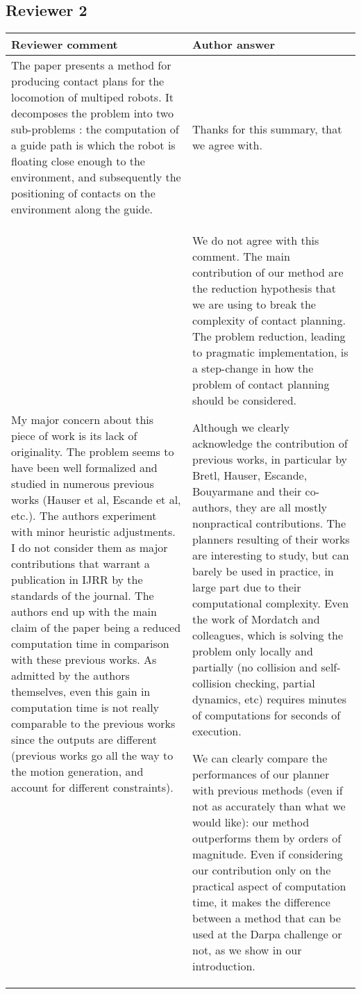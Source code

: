 \documentclass[a4paper]{article}
\begin{document}
\subsection{Reviewer 2}
\noindent
\begin{longtable}{|p{21em}|p{21em}|}
\hline \bf Reviewer comment & \bf Author answer \\
\hline
The paper presents a method for producing contact plans for the locomotion of multiped robots. It decomposes the problem into two sub-problems : the computation of a guide path is which the robot is floating close enough to the environment, and subsequently the positioning of contacts on the environment along the guide.
& Thanks for this summary, that we agree with.
\\ \hline %
My major concern about this piece of work is its lack of originality. The problem seems to have been well formalized and studied in numerous previous works (Hauser et al, Escande et al, etc.). The authors experiment with minor heuristic adjustments. I do not consider them as major contributions that warrant a publication in IJRR by the standards of the journal. The authors end up with the main claim of the paper being a reduced computation time in comparison with these previous works. As admitted by the authors themselves, even this gain in computation time is not really comparable to the previous works since the outputs are different (previous works go all the way to the motion generation, and account for different constraints).
&
We do not agree with this comment.
The main contribution of our method are the reduction hypothesis that we are using to break the complexity of contact planning.
The problem reduction, leading to pragmatic implementation, is a step-change in how the problem of contact planning should be considered.

Although we clearly acknowledge the contribution of previous works, in particular by Bretl, Hauser, Escande, Bouyarmane and their co-authors, they are all mostly nonpractical contributions.
The  planners resulting of their works are interesting to study, but can barely be used in practice, in large part due to their computational complexity. 
Even the work of Mordatch and colleagues, which is solving the problem only locally and partially (no collision and self-collision checking, partial dynamics, etc) requires minutes of computations for seconds of execution.
 
We can clearly compare the performances of our planner with previous methods (even if not as accurately than what we would like): our method outperforms them by orders of magnitude.
Even if considering our contribution only on the practical aspect of computation time,  it makes the difference between a method that can be used at the Darpa challenge or not, as we show in our introduction.


\end{longtable}
\end{document}
